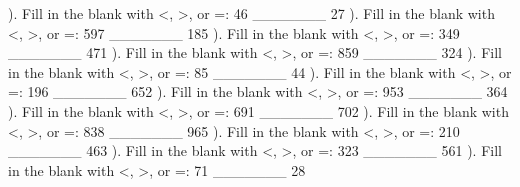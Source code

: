 \documentclass{article}%
\begin{document}
\newline%
). Fill in the blank with <, >, or =: 46 \_\_\_\_\_\_\_ 27%
\newline%
\newline%
). Fill in the blank with <, >, or =: 597 \_\_\_\_\_\_\_ 185%
\newline%
\newline%
). Fill in the blank with <, >, or =: 349 \_\_\_\_\_\_\_ 471%
\newline%
\newline%
). Fill in the blank with <, >, or =: 859 \_\_\_\_\_\_\_ 324%
\newline%
\newline%
). Fill in the blank with <, >, or =: 85 \_\_\_\_\_\_\_ 44%
\newline%
\newline%
). Fill in the blank with <, >, or =: 196 \_\_\_\_\_\_\_ 652%
\newline%
\newline%
). Fill in the blank with <, >, or =: 953 \_\_\_\_\_\_\_ 364%
\newline%
\newline%
). Fill in the blank with <, >, or =: 691 \_\_\_\_\_\_\_ 702%
\newline%
\newline%
). Fill in the blank with <, >, or =: 838 \_\_\_\_\_\_\_ 965%
\newline%
\newline%
). Fill in the blank with <, >, or =: 210 \_\_\_\_\_\_\_ 463%
\newline%
\newline%
). Fill in the blank with <, >, or =: 323 \_\_\_\_\_\_\_ 561%
\newline%
\newline%
). Fill in the blank with <, >, or =: 71 \_\_\_\_\_\_\_ 28%
\newline%
\newline%
\end{document}

